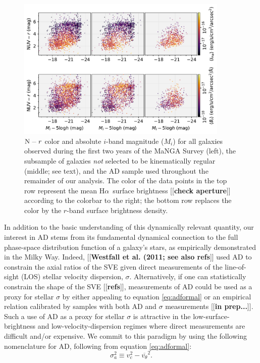 \documentclass[apj,iop,revtex4,numberedappendix]{emulateapj}
\newcommand{\comment}[2][todo]{{\color{#1}[[{\bf #2}]]}}
\newcommand{\halpha}{H$\alpha$}
\begin{document}
\begin{figure}
%
\begin{center}
%
\includegraphics[width=0.9\textwidth]{figs/cmd_flux.pdf}
%
\end{center}
%
\caption{
%
${\rm N} - r$ color and absolute $i$-band magnitude ($M_i$) for all
galaxies observed during the first two years of the MaNGA Survey (left),
the subsample of galaxies {\em not} selected to be kinematically regular
(middle; see text), and the AD sample used throughout the remainder of
our analysis.  The color of the data points in the top row represent the
mean \halpha\ surface brightness \comment{check aperture} according to
the colorbar to the right; the bottom row replaces the color by the
$r$-band surface brightness density.
%
}
%
\label{fig:sample}
%
\end{figure}

In addition to the basic understanding of this dynamically relevant
quantity, our interest in AD stems from its fundamental dynamical
connection to the full phase-space distribution function of a galaxy's
stars, as empirically demonstrated in the Milky Way.  Indeed,
\comment{Westfall et al. (2011; see also refs} used AD to constrain the
axial ratios of the SVE given direct measurements of the line-of-sight
(LOS) stellar velocity dispersion, $\sigma$.  Alternatively, if one can
statistically constrain the shape of the SVE \comment{refs},
measurements of AD could be used as a proxy for stellar $\sigma$ by
either appealing to equation \ref{eq:adformal} or an empirical relation
calibrated by samples with both AD and $\sigma$ measurements \comment{in
prep...}.  Such a use of AD as a proxy for stellar $\sigma$ is
attractive in the low-surface-brightness and low-velocity-dispersion
regimes where direct measurements are difficult and/or expensive.  We
commit to this paradigm by using the following nomenclature for AD,
following from equation \ref{eq:adformal}:
%
\begin{equation}
%
\sigma_a^2 \equiv v_c^2 - \overline{v_\theta}^2.
%
\label{eq:addef}
%
\end{equation}
\end{document}
